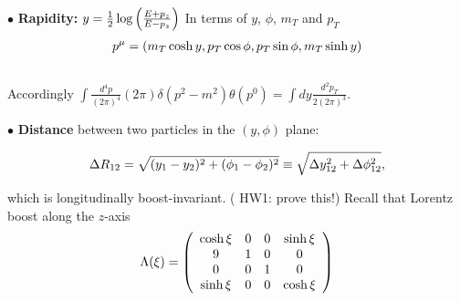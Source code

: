 \documentclass[9pt,a4paper,unknownkeysallowed,xcolor=dvipsnames,aspectratio=43]{beamer}
\begin{document}
\begin{frame}
\vspace{2mm}
{\color{darkred}\Large$\bullet$} {\bf Rapidity:} 
$
y=\frac{1}{2}\log\left(\frac{E+p_z}{E-p_z}\right)\notag
$
In terms of $y$, $\phi$, $m_T$ and $p_T$
\begin{align}
 p^\mu=(m_T\cosh y, p_T\cos\phi, p_T\sin\phi, m_T\sinh y)\notag 
\end{align}\\
\vspace{1mm}
Accordingly $\int\frac{d^4p}{(2\pi)^4} (2\pi)\delta(p^2-m^2)\theta(p^0)=\int dy\frac{d^2p_T}{2(2\pi)^3}$.
\vspace{4mm}

{\color{darkred}\Large$\bullet$} {\bf Distance} between two particles in the $(y, \phi)$ plane:

\begin{align}
    \Delta R_{12}=\sqrt{(y_1-y_2)^2 + (\phi_1-\phi_2)^2}\equiv \sqrt{\Delta y^2_{12}+\Delta \phi^2_{12}},\notag
\end{align}
\vspace{2mm}

which is longitudinally boost-invariant. ({\color{darkred} HW1: prove this!}) Recall that Lorentz boost along the $z$-axis
\begin{align}
    \Lambda(\xi)=\left(\begin{array}{c c c c}
         \cosh\xi & 0 & 0 & \sinh\xi\\
         9 & 1 & 0 & 0 \\
         0 & 0 & 1 & 0\\
         \sinh\xi & 0 & 0 & \cosh\xi
    \end{array}\right)\notag
\end{align}
\end{frame}
%
%
\end{document}
